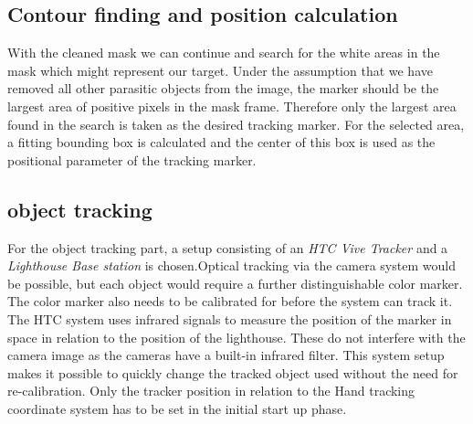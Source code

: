 \subsection{Contour finding and position calculation}
With the cleaned mask we can continue and search for the white areas in the mask which might represent our target. Under the assumption that we have removed all other parasitic objects from the image, the marker should be the largest area of positive pixels in the mask frame. Therefore only the largest area found in the search is taken as the desired tracking marker. For the selected area, a fitting bounding box is calculated and the center of this box is used as the positional parameter of the tracking marker.
\subsection{object tracking}
For the object tracking part, a setup consisting of an \textit{HTC Vive Tracker} and a \textit{Lighthouse Base station} is chosen.Optical tracking via the camera system would be possible, but each object would require a further distinguishable color marker. The color marker also needs to be calibrated for before the system can track it. The HTC system uses infrared signals to measure the position of the marker in space in relation to the position of the lighthouse. These do not interfere with the camera image as the cameras have a built-in infrared filter. This system setup makes it possible to quickly change the tracked object used without the need for re-calibration. Only the tracker position in relation to the Hand tracking coordinate system has to be set in the initial start up phase.  
